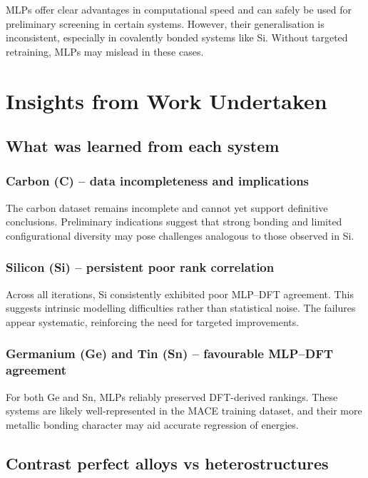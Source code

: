 MLPs offer clear advantages in computational speed and can safely be used for preliminary screening in certain systems.
However, their generalisation is inconsistent, especially in covalently bonded systems like Si. Without targeted
retraining, MLPs may mislead in these cases.


\section{Insights from Work Undertaken}
\label{section:insights_from_work}

\subsection{What was learned from each system}

\subsubsection{Carbon (C) – data incompleteness and implications}

The carbon dataset remains incomplete and cannot yet support definitive conclusions. Preliminary indications suggest
that strong bonding and limited configurational diversity may pose challenges analogous to those observed in Si.

\subsubsection{Silicon (Si) – persistent poor rank correlation}

Across all iterations, Si consistently exhibited poor MLP--DFT agreement. This suggests intrinsic modelling
difficulties rather than statistical noise. The failures appear systematic, reinforcing the need for targeted
improvements.

\subsubsection{Germanium (Ge) and Tin (Sn) – favourable MLP--DFT agreement}

For both Ge and Sn, MLPs reliably preserved DFT-derived rankings. These systems are likely well-represented in the MACE
training dataset, and their more metallic bonding character may aid accurate regression of energies.

\subsection{Contrast perfect alloys vs heterostructures}

